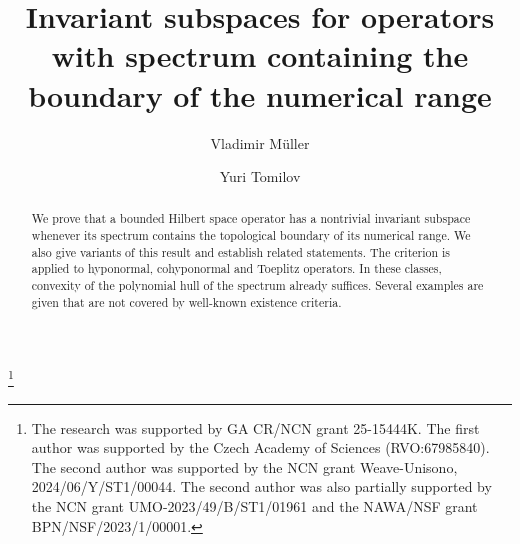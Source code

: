 \documentclass[11pt]{amsart}
\numberwithin{equation}{section}
\theoremstyle{definition}
\theoremstyle{remark}
\begin{document}
\title
[Invariant subspaces and numerical range]{Invariant subspaces for operators with spectrum containing the boundary of the numerical range}


\author{Vladimir M\"uller}
\address{Institute of Mathematics\\
Czech Academy of Sciences\\
\v Zitna Str. 25, 115 67 Prague\\
Czech Republic}
 

\author{Yuri Tomilov}
\address{
Institute of Mathematics\\
Polish Academy of Sciences\\
\'Sniadeckich 8\\
00-656 Warsaw, Poland\\
Faculty of Mathematics and Computer Science\\
Nicolaus Copernicus University\\
Chopin Street 12/18\\
87-100 Toru\'n, Poland
}

\thanks{The research was supported by GA CR/NCN grant 25-15444K. The first author was supported by the Czech Academy of Sciences (RVO:67985840). The second author was supported by the NCN grant Weave-Unisono, 2024/06/Y/ST1/00044. The second author was also partially supported by the NCN grant UMO-2023/49/B/ST1/01961 and the NAWA/NSF grant BPN/NSF/2023/1/00001.}

\begin{abstract}
We prove that a bounded Hilbert space operator has a nontrivial invariant
subspace whenever its spectrum contains the topological boundary of its
numerical range. We also give variants of this result and establish related
statements. The criterion is applied to hyponormal, cohyponormal and Toeplitz
operators. In these classes, convexity of the polynomial hull of the spectrum
already suffices. Several examples are given that are not covered by
well-known existence criteria.
\end{abstract}

\maketitle
\end{document}
